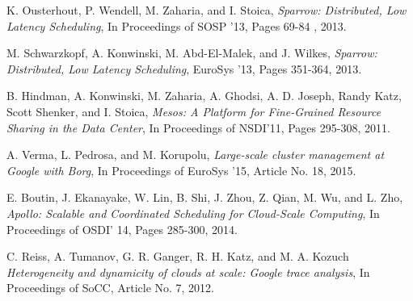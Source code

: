\documentclass[11pt]{article}
\begin{document}
\begin{thebibliography}{9}

  K. Ousterhout, P. Wendell, M. Zaharia, and I. Stoica,
  \textit{Sparrow: Distributed, Low Latency Scheduling},
  In Proceedings of SOSP '13,
  Pages 69-84 ,
  2013.

  M. Schwarzkopf, A. Konwinski, M. Abd-El-Malek, and J. Wilkes,
  \textit{Sparrow: Distributed, Low Latency Scheduling},
  EuroSys '13,
  Pages 351-364,
  2013.
  
  B. Hindman, A. Konwinski, M. Zaharia, A. Ghodsi, A. D. Joseph, Randy Katz, Scott Shenker, and I. Stoica,
  \textit{Mesos: A Platform for Fine-Grained Resource Sharing in the Data Center},
  In Proceedings of NSDI'11,
  Pages 295-308,
  2011.
  
  A. Verma, L. Pedrosa, and M. Korupolu,
  \textit{Large-scale cluster management at Google with Borg},
  In Proceedings of EuroSys '15,
  Article No. 18,
  2015.

  E. Boutin, J. Ekanayake, W. Lin, B. Shi, J. Zhou, Z. Qian, M. Wu, and L. Zho,
  \textit{Apollo: Scalable and Coordinated Scheduling for Cloud-Scale Computing},
  In Proceedings of OSDI' 14,
  Pages 285-300,
  2014.
  
  C. Reiss, A. Tumanov, G. R. Ganger, R. H. Katz, and M. A. Kozuch
  \textit{Heterogeneity and dynamicity of clouds at scale: Google trace analysis},
  In Proceedings of SoCC,
  Article No. 7,
  2012.


\end{thebibliography}
\end{document}
